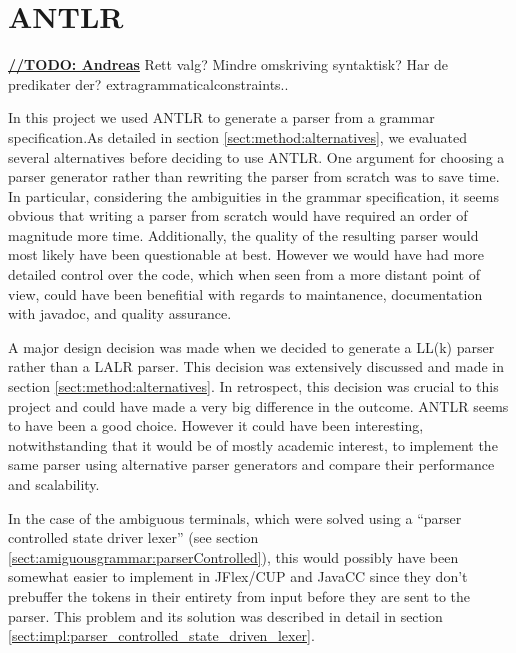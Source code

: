 \section{ANTLR}
\label{sect:discussion:antlr}

\underline{\textbf{\LARGE //TODO: Andreas}} Rett valg? Mindre omskriving syntaktisk? Har de predikater der? extragrammaticalconstraints..

In this project we used ANTLR to generate a parser from a grammar
specification.As detailed in section \ref{sect:method:alternatives}, we
evaluated several alternatives before deciding to use ANTLR. One argument for
choosing a parser generator rather than rewriting the parser from scratch was to
save time. In particular, considering the ambiguities in the grammar
specification, it seems obvious that writing a parser from scratch would
have required an order of magnitude more time. Additionally, the quality of the
resulting parser would most likely have been questionable at best. However
we would have had more detailed control over the code, which when seen from a
more distant point of view, could have been benefitial with regards to
maintanence, documentation with javadoc, and quality assurance.

A major design decision was made when we decided to generate a LL(k) parser rather
than a LALR parser. This decision was extensively discussed and made in
section \ref{sect:method:alternatives}. In retrospect, this decision was
crucial to this project and could have made a very big difference in the
outcome. ANTLR seems to have been a good choice. However it could have been
interesting, notwithstanding that it would be of mostly academic interest, to  
implement the same parser using alternative parser generators and compare their
performance and scalability.

In the case of the ambiguous terminals, which were solved using a ``parser
controlled state driver lexer'' (see section 
\ref{sect:amiguousgrammar:parserControlled}), this would possibly have been
somewhat easier to implement in JFlex/CUP and JavaCC since they don't prebuffer 
the tokens in their entirety from input before they are sent to the parser. This
problem and its solution was described in detail in section
\ref{sect:impl:parser_controlled_state_driven_lexer}.